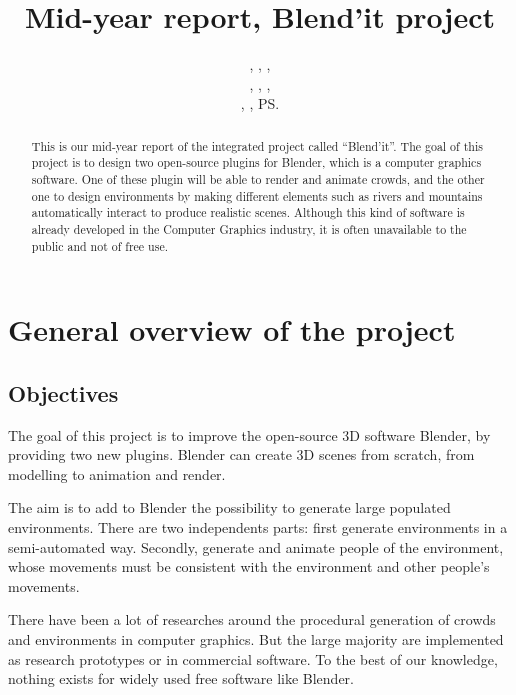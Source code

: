 \documentclass[a4paper,11pt]{article}
\title{Mid-year report, Blend'it project}
\author{\bb, \gc, \dl,\\ \vl, \om, \mr,\\ \me, \js, \ps}
\begin{document}
\maketitle

\begin{abstract}
This is our mid-year  report of the integrated project called ``Blend'it''. The goal of this project is to design two open-source plugins for Blender, which is a computer graphics software. One of these plugin will be able to render and animate crowds, and the other one to design environments by making different elements such as rivers and mountains automatically interact to produce realistic scenes. Although this kind of software is already developed in the Computer Graphics industry, it is often unavailable to the public and not of free use.
\end{abstract}


\tableofcontents

\newpage

\section{General overview of the project}

\subsection{Objectives}
The goal of this project is to improve the open-source 3D software Blender, by providing two new plugins. Blender can create 3D scenes from scratch, from modelling to animation and render.

The aim is to add to Blender the possibility to generate large populated environments. There are two independents parts: first generate environments in a semi-automated way. Secondly, generate and animate people of the environment, whose movements must be consistent with the environment and other people's movements.

There have been a lot of researches around the procedural generation of crowds and environments in computer graphics. But the large majority are implemented as research prototypes or in commercial software. To the best of our knowledge, nothing exists for widely used free software like Blender.
\end{document}
